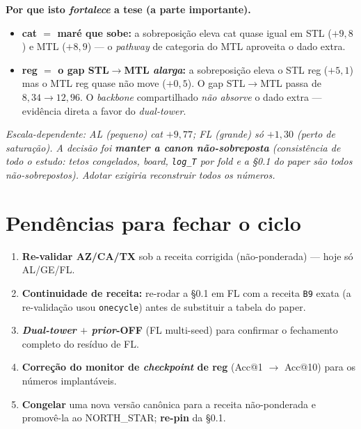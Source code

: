 \documentclass[11pt,a4paper]{article}
\newcommand{\note}[1]{\textcolor{black!55}{\textit{#1}}}
\begin{document}
\noindent\textbf{Por que isto \emph{fortalece} a tese (a parte importante).}
\begin{itemize}[leftmargin=*,noitemsep]
\item \textbf{cat $=$ maré que sobe:} a sobreposição eleva cat quase igual em STL ($+9{,}8$) e MTL
($+8{,}9$) --- o \textit{pathway} de categoria do MTL aproveita o dado extra.
\item \textbf{reg $=$ o gap STL$\to$MTL \emph{alarga}:} a sobreposição eleva o STL reg ($+5{,}1$) mas o
MTL reg quase não move ($+0{,}5$). O gap STL$\to$MTL passa de $8{,}34 \to 12{,}96$. O
\textit{backbone} compartilhado \emph{não absorve} o dado extra --- evidência direta a favor do
\textit{dual-tower}.
\end{itemize}
\note{Escala-dependente: AL (pequeno) cat $+9{,}77$; FL (grande) só $+1{,}30$ (perto de saturação). A
\emph{decisão} foi \textbf{manter a canon não-sobreposta} (consistência de todo o estudo: tetos
congelados, \textit{board}, \texttt{log\_T} por \textit{fold} e a \S0.1 do paper são todos
não-sobrepostos). Adotar exigiria reconstruir todos os números.}

\section{Pendências para fechar o ciclo}\label{sec:pend}

\begin{enumerate}[leftmargin=*,noitemsep]
\item \textbf{Re-validar AZ/CA/TX} sob a receita corrigida (não-ponderada) --- hoje só AL/GE/FL.
\item \textbf{Continuidade de receita:} re-rodar a \S0.1 em FL com a receita \texttt{B9} exata (a
re-validação usou \texttt{onecycle}) antes de substituir a tabela do paper.
\item \textbf{\textit{Dual-tower} $+$ \textit{prior}-OFF} (FL multi-seed) para confirmar o fechamento
completo do resíduo de FL.
\item \textbf{Correção do monitor de \textit{checkpoint} de reg} (Acc@1 $\to$ Acc@10) para os números
implantáveis.
\item \textbf{Congelar} uma nova versão canônica para a receita não-ponderada e promovê-la ao
NORTH\_STAR; \textbf{re-pin} da \S0.1.
\end{enumerate}
\end{document}
